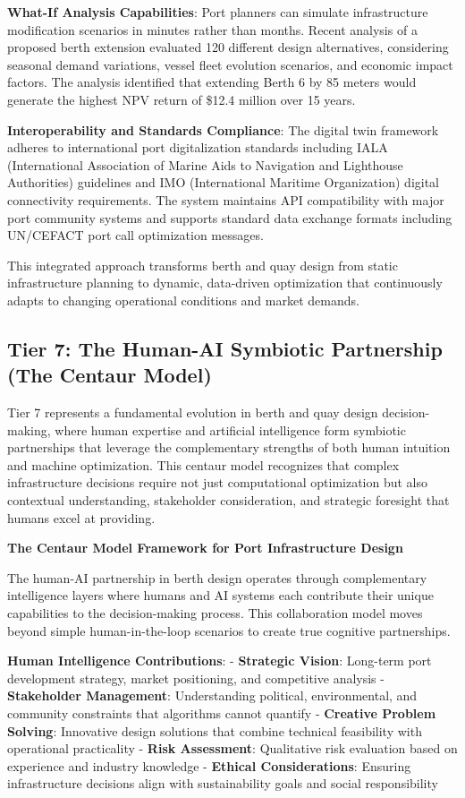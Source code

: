 \documentclass{article}
\begin{document}
\textbf{What-If Analysis Capabilities}: Port planners can simulate infrastructure modification scenarios in minutes rather than months. Recent analysis of a proposed berth extension evaluated 120 different design alternatives, considering seasonal demand variations, vessel fleet evolution scenarios, and economic impact factors. The analysis identified that extending Berth 6 by 85 meters would generate the highest NPV return of \$12.4 million over 15 years.

\textbf{Interoperability and Standards Compliance}: The digital twin framework adheres to international port digitalization standards including IALA (International Association of Marine Aids to Navigation and Lighthouse Authorities) guidelines and IMO (International Maritime Organization) digital connectivity requirements. The system maintains API compatibility with major port community systems and supports standard data exchange formats including UN/CEFACT port call optimization messages.

This integrated approach transforms berth and quay design from static infrastructure planning to dynamic, data-driven optimization that continuously adapts to changing operational conditions and market demands.

\subsection{Tier 7: The Human-AI Symbiotic Partnership (The Centaur Model)}

Tier 7 represents a fundamental evolution in berth and quay design decision-making, where human expertise and artificial intelligence form symbiotic partnerships that leverage the complementary strengths of both human intuition and machine optimization. This centaur model recognizes that complex infrastructure decisions require not just computational optimization but also contextual understanding, stakeholder consideration, and strategic foresight that humans excel at providing.

\textbf{The Centaur Model Framework for Port Infrastructure Design}

The human-AI partnership in berth design operates through complementary intelligence layers where humans and AI systems each contribute their unique capabilities to the decision-making process. This collaboration model moves beyond simple human-in-the-loop scenarios to create true cognitive partnerships.

\textbf{Human Intelligence Contributions}:
- \textbf{Strategic Vision}: Long-term port development strategy, market positioning, and competitive analysis
- \textbf{Stakeholder Management}: Understanding political, environmental, and community constraints that algorithms cannot quantify
- \textbf{Creative Problem Solving}: Innovative design solutions that combine technical feasibility with operational practicality
- \textbf{Risk Assessment}: Qualitative risk evaluation based on experience and industry knowledge
- \textbf{Ethical Considerations}: Ensuring infrastructure decisions align with sustainability goals and social responsibility
\end{document}
